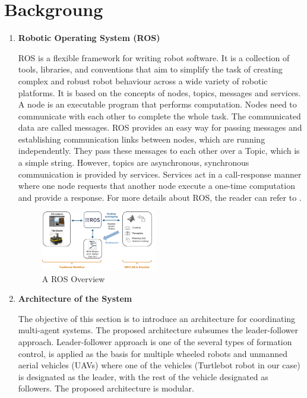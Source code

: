 \documentclass[journal]{IEEEtran}
\begin{document}
\section{Backgroung}
\begin{enumerate}
\item \textbf{Robotic Operating System (ROS)}

ROS is a flexible framework for writing robot software. It is a collection of tools, libraries, and conventions that aim to simplify the task of creating complex and robust robot behaviour across a wide variety of robotic platforms. It is based on the concepts of nodes, topics, messages and services. A node is an executable program that performs computation. Nodes need to communicate with each other to complete the whole task. The communicated data are called messages. ROS provides an easy way for passing messages and establishing communication links between nodes, which are running independently. They pass these messages to each other over a Topic, which is a simple string. However, topics are asynchronous, synchronous communication is provided by services. Services act in a call-response manner where one node requests that another node execute a one-time computation and provide a response. For more details about ROS, the reader can refer to \cite{temp2}.

\begin{figure}[!h]
\begin{center}
\includegraphics[width=2in]{6.png}
\caption{A ROS Overview \cite{temp2}}
\end{center}
\end{figure}




\item \textbf{Architecture of the System}


The objective of this section is to introduce an architecture for coordinating multi-agent systems. The proposed architecture subsumes the leader-follower approach. Leader-follower approach is one of the several types of formation control, is applied as the basis for multiple wheeled robots and unmanned aerial vehicles (UAVs) where one of the vehicles (Turtlebot robot in our case) is designated as the leader, with the rest of the vehicle designated as followers. The proposed architecture is modular.



\end{enumerate}
\end{document}
